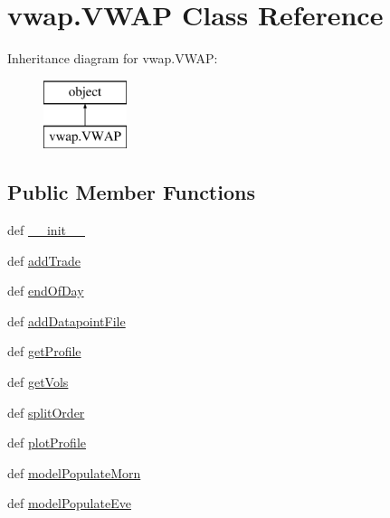 \hypertarget{classvwap_1_1_v_w_a_p}{\section{vwap.\-V\-W\-A\-P Class Reference}
\label{classvwap_1_1_v_w_a_p}
}
Inheritance diagram for vwap.\-V\-W\-A\-P\-:\begin{figure}[H]
\begin{center}
\leavevmode
\includegraphics[height=2.000000cm]{classvwap_1_1_v_w_a_p}
\end{center}
\end{figure}
\subsection*{Public Member Functions}
\begin{DoxyCompactItemize}
\item 
def \hyperlink{classvwap_1_1_v_w_a_p_a09557a7fe8656f43bca66149a13a464a}{\-\_\-\-\_\-init\-\_\-\-\_\-}
\item 
def \hyperlink{classvwap_1_1_v_w_a_p_a0f290cba87a872736e1a3bcad6c89b43}{add\-Trade}
\item 
def \hyperlink{classvwap_1_1_v_w_a_p_a3d37dbb03735ea3ae3e7906185bb4449}{end\-Of\-Day}
\item 
def \hyperlink{classvwap_1_1_v_w_a_p_ab0f2a43f243c87231d5cc46f1eabf739}{add\-Datapoint\-File}
\item 
def \hyperlink{classvwap_1_1_v_w_a_p_aa05dc072b2b695b0e7607dbf94dbc382}{get\-Profile}
\item 
def \hyperlink{classvwap_1_1_v_w_a_p_a4859f45ec9daaa4930b285f2021d91ac}{get\-Vols}
\item 
def \hyperlink{classvwap_1_1_v_w_a_p_a548cde7f6790801319bf5b47ff6a33d3}{split\-Order}
\item 
def \hyperlink{classvwap_1_1_v_w_a_p_ae5d93dc3c8fbdb0a042995d46a973599}{plot\-Profile}
\item 
def \hyperlink{classvwap_1_1_v_w_a_p_a80ba4a905a018d5e3d296c6c381cee64}{model\-Populate\-Morn}
\item 
def \hyperlink{classvwap_1_1_v_w_a_p_ae0b5666964e55c14503ce807f2444044}{model\-Populate\-Eve}
\end{DoxyCompactItemize}
